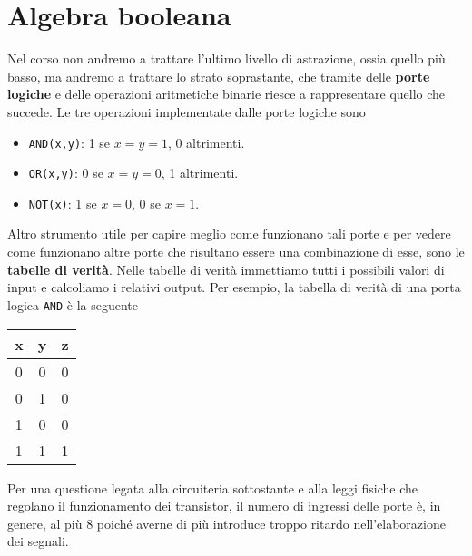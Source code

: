 \section{Algebra booleana}
Nel corso non andremo a trattare l'ultimo livello di astrazione, ossia quello più basso, ma andremo
a trattare lo strato soprastante, che tramite delle \textbf{porte logiche} e delle operazioni
aritmetiche binarie riesce a rappresentare quello che succede. Le tre operazioni implementate dalle
porte logiche sono
\begin{itemize}
	\item \verb|AND(x,y)|: 1 se $x = y = 1$, 0 altrimenti.
	\item \verb|OR(x,y)|: 0 se $x = y = 0$, 1 altrimenti.
	\item \verb|NOT(x)|: 1 se $x=0$, 0 se $x=1$.
\end{itemize}
Altro strumento utile per capire meglio come funzionano tali porte e per vedere come funzionano
altre porte che risultano essere una combinazione di esse, sono le \textbf{tabelle di verità}.
Nelle tabelle di verità immettiamo tutti i possibili valori di input e calcoliamo i relativi output.
Per esempio, la tabella di verità di una porta logica \verb|AND| è la seguente
\begin{center}
	\begin{tabular}{c c | c}
		x & y & z \\ \hline
		0 & 0 & 0 \\
		0 & 1 & 0 \\
		1 & 0 & 0 \\
		1 & 1 & 1
	\end{tabular}
\end{center}
Per una questione legata alla circuiteria sottostante e alla leggi fisiche che regolano il
funzionamento dei transistor, il numero di ingressi delle porte è, in genere, al più 8 poiché
averne di più introduce troppo ritardo nell'elaborazione dei segnali.

